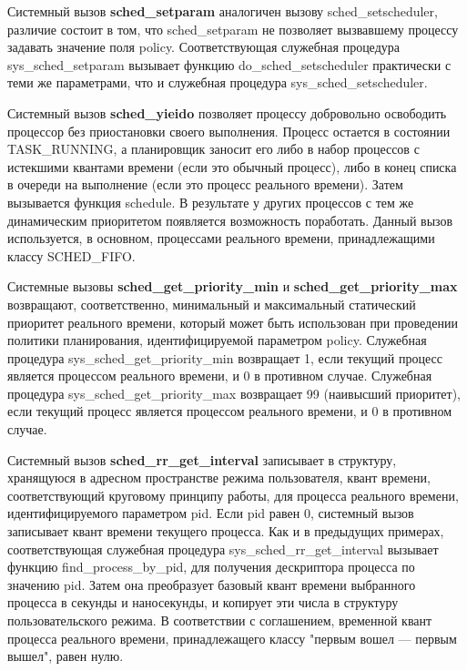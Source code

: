 Системный вызов \textbf{sched\_setparam} аналогичен вызову sched\_setscheduler, различие состоит в том, что sched\_setparam не позволяет вызвавшему процессу задавать значение поля policy. Соответствующая служебная процедура sys\_sched\_setparam вызывает функцию do\_sched\_setscheduler практически с теми же параметрами, что и служебная процедура sys\_sched\_setscheduler.

Системный вызов \textbf{sched\_yieido} позволяет процессу добровольно освободить процессор без приостановки своего выполнения. Процесс остается в состоянии TASK\_RUNNING, а планировщик заносит его либо в набор процессов с истекшими квантами времени (если это обычный процесс), либо в конец списка в очереди на выполнение (если это процесс реального времени). Затем вызывается функция schedule. В результате у других процессов с тем же динамическим приоритетом появляется возможность поработать. Данный вызов используется, в основном, процессами реального времени, принадлежащими классу SCHED\_FIFO.

Системные вызовы \textbf{sched\_get\_priority\_min} и \textbf{sched\_get\_priority\_max} возвращают, соответственно, минимальный и максимальный статический приоритет реального времени, который может быть использован при проведении политики планирования, идентифицируемой параметром policy. Служебная процедура sys\_sched\_get\_priority\_min возвращает 1, если текущий процесс является процессом реального времени, и 0 в противном случае. Служебная процедура sys\_sched\_get\_priority\_max возвращает 99 (наивысший приоритет), если текущий процесс является процессом реального времени, и 0 в противном случае.

Системный вызов \textbf{sched\_rr\_get\_interval} записывает в структуру, хранящуюся в адресном пространстве режима пользователя, квант времени, соответствующий круговому принципу работы, для процесса реального времени, идентифицируемого параметром pid. Если pid равен 0, системный вызов записывает квант времени текущего процесса. Как и в предыдущих примерах, соответствующая служебная процедура sys\_sched\_rr\_get\_interval вызывает функцию find\_process\_by\_pid, для получения дескриптора процесса по значению pid. Затем она преобразует базовый квант времени выбранного процесса в секунды и наносекунды, и копирует эти числа в структуру пользовательского режима. В соответствии с соглашением, временной квант процесса реального времени, принадлежащего классу "первым вошел — первым вышел", равен нулю.